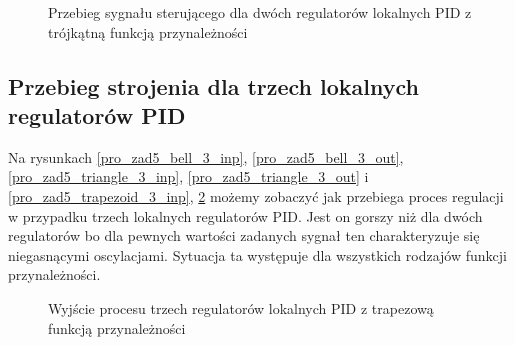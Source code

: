 \begin{figure}[b]
    \centering
    \caption{Przebieg sygnału sterującego dla dwóch regulatorów lokalnych PID z trójkątną  funkcją przynależności}
    \label{pro_zad5_triangle_2_inp}
\end{figure}
\FloatBarrier

\subsection{Przebieg strojenia dla trzech lokalnych regulatorów PID}
Na rysunkach \ref{pro_zad5_bell_3_inp}, \ref{pro_zad5_bell_3_out}, \ref{pro_zad5_triangle_3_inp}, \ref{pro_zad5_triangle_3_out} i \ref{pro_zad5_trapezoid_3_inp}, \ref{pro_zad5_trapezoid_3_out} możemy zobaczyć jak przebiega proces regulacji w przypadku trzech lokalnych regulatorów PID. Jest on gorszy niż dla dwóch regulatorów bo dla pewnych wartości zadanych sygnał ten charakteryzuje się niegasnącymi oscylacjami. Sytuacja ta występuje dla wszystkich rodzajów funkcji przynależności. 
\begin{figure}[b]
    \centering
    \caption{Wyjście procesu trzech regulatorów lokalnych PID z trapezową funkcją przynależności}
    \label{pro_zad5_trapezoid_3_out}
\end{figure}

